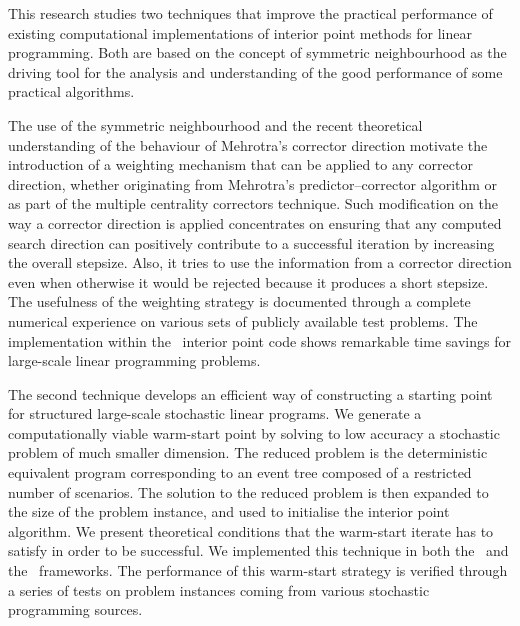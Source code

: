
%
%

This research studies two techniques that improve
the practical performance of existing computational implementations 
of interior point methods for linear programming.
Both are based on the concept of symmetric neighbourhood 
as the driving tool for the analysis and understanding of the good 
performance of some practical algorithms. 

The use of the symmetric neighbourhood and the recent
theoretical understanding of the behaviour of Mehrotra's
corrector direction motivate the introduction of a weighting
mechanism that can be applied to any corrector direction,
whether originating from Mehrotra's predictor--corrector algorithm
or as part of the multiple centrality correctors technique.
Such modification on the way a corrector direction is applied
concentrates on ensuring that any computed search direction can positively
contribute to a successful iteration by increasing the overall
stepsize. Also, it tries to use the information from a corrector
direction even when otherwise it would be rejected because it
produces a short stepsize. 
The usefulness of the weighting strategy is documented through
a complete numerical experience on various sets of publicly
available test problems.
The implementation within the \HOPDM\ interior point code
shows remarkable time savings for large-scale linear programming problems.

The second technique develops an efficient way of 
constructing a starting point for structured large-scale 
stochastic linear programs.
We generate a computationally viable warm-start point by solving 
to low accuracy a stochastic problem of much smaller dimension.
The reduced problem is the deterministic equivalent program
corresponding to an event tree composed of a restricted number
of scenarios.
The solution to the reduced problem is then expanded to the
size of the problem instance, and used to initialise the
interior point algorithm.
We present theoretical conditions that the warm-start iterate
has to satisfy in order to be successful.
We implemented this technique in both the \HOPDM\ and the \OOPS\
frameworks.
The performance of this warm-start strategy is verified through 
a series of tests on problem instances coming from various stochastic
programming sources.
